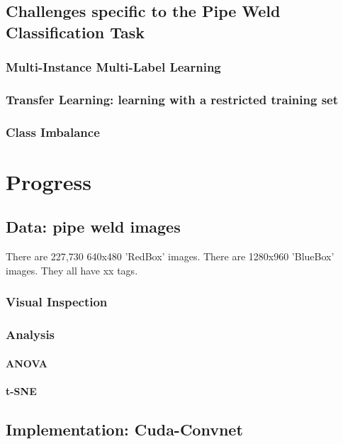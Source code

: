 \documentclass[a4paper,11pt]{article}
\begin{document}
\subsection{Challenges specific to the Pipe Weld Classification Task}

\subsubsection{Multi-Instance Multi-Label Learning}

\subsubsection{Transfer Learning: learning with a restricted training set}

\subsubsection{Class Imbalance}

\clearpage



\clearpage
\section{Progress}

\subsection{Data: pipe weld images}
There are 227,730 640x480 'RedBox' images. There are 1280x960 'BlueBox' images. They all have xx tags.

\subsubsection{Visual Inspection}
\subsubsection{Analysis}
\paragraph{ANOVA}
\paragraph{t-SNE}

\subsection{Implementation: Cuda-Convnet}
\end{document}
